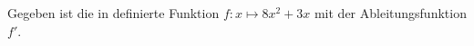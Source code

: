 \documentclass[preview]{standalone}
\begin{document}
\begin{center}
Gegeben ist die in  definierte Funktion $f: x \mapsto 8x^2 + 3x$ mit der Ableitungsfunktion $f'$.
\end{center}
\end{document}

